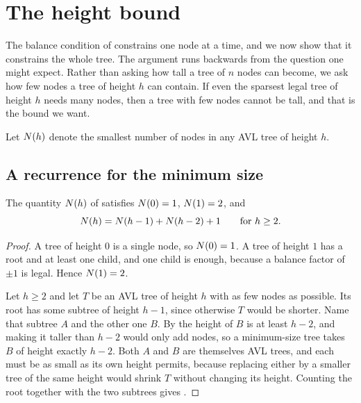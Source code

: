 \section{The height bound}
\label{sec:height}

The balance condition of  constrains one node at a time, and we
now show that it constrains the whole tree. The argument runs backwards from the
question one might expect. Rather than asking how tall a tree of $n$ nodes can
become, we ask how few nodes a tree of height $h$ can contain. If even the
sparsest legal tree of height $h$ needs many nodes, then a tree with few nodes
cannot be tall, and that is the bound we want.

\begin{definition}
\label{def:nh}
Let $N(h)$ denote the smallest number of nodes in any AVL tree of height $h$.
\end{definition}

\subsection{A recurrence for the minimum size}

\begin{lemma}
\label{lem:recurrence}
The quantity $N(h)$ of  satisfies $N(0) = 1$,
$N(1) = 2$, and
\begin{equation}
  \label{eq:nrec}
  N(h) = N(h-1) + N(h-2) + 1 \qquad \text{for } h \ge 2 .
\end{equation}
\end{lemma}

\begin{proof}
A tree of height $0$ is a single node, so $N(0) = 1$. A tree of height $1$
has a root and at least one child, and one child is enough, because a balance
factor of $\pm 1$ is legal. Hence $N(1) = 2$.

Let $h \ge 2$ and let $T$ be an AVL tree of height $h$ with as few nodes as
possible. Its root has some subtree of height $h-1$, since otherwise $T$ would be
shorter. Name that subtree $A$ and the other one $B$. By  the
height of $B$ is at least $h-2$, and making it taller than $h-2$ would only add
nodes, so a minimum-size tree takes $B$ of height exactly $h-2$. Both $A$ and $B$
are themselves AVL trees, and each must be as small as its own height permits,
because replacing either by a smaller tree of the same height would shrink $T$
without changing its height. Counting the root together with the two subtrees
gives .
\end{proof}

